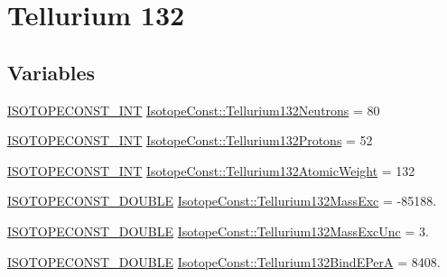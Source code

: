 \hypertarget{group___isotope_const-_tellurium-_te132}{}\section{Tellurium 132}
\label{group___isotope_const-_tellurium-_te132}
\subsection*{Variables}
\begin{DoxyCompactItemize}
\item 
\mbox{\hyperlink{group___isotope_const-_macros_ga5f18360b3e99483a35c32d789e62621c}{I\+S\+O\+T\+O\+P\+E\+C\+O\+N\+S\+T\+\_\+\+I\+NT}} \mbox{\hyperlink{group___isotope_const-_tellurium-_te132_ga6560f23356e4ba567d8e2cf1ead3287b}{Isotope\+Const\+::\+Tellurium132\+Neutrons}} = 80
\item 
\mbox{\hyperlink{group___isotope_const-_macros_ga5f18360b3e99483a35c32d789e62621c}{I\+S\+O\+T\+O\+P\+E\+C\+O\+N\+S\+T\+\_\+\+I\+NT}} \mbox{\hyperlink{group___isotope_const-_tellurium-_te132_gaf0aa5df2baffe38d65011ba79f5e76c4}{Isotope\+Const\+::\+Tellurium132\+Protons}} = 52
\item 
\mbox{\hyperlink{group___isotope_const-_macros_ga5f18360b3e99483a35c32d789e62621c}{I\+S\+O\+T\+O\+P\+E\+C\+O\+N\+S\+T\+\_\+\+I\+NT}} \mbox{\hyperlink{group___isotope_const-_tellurium-_te132_ga73a0da92aa12ca67033b6f66eb587bd5}{Isotope\+Const\+::\+Tellurium132\+Atomic\+Weight}} = 132
\item 
\mbox{\hyperlink{group___isotope_const-_macros_ga8f45a7272ce02c0b4c65c44636ed719a}{I\+S\+O\+T\+O\+P\+E\+C\+O\+N\+S\+T\+\_\+\+D\+O\+U\+B\+LE}} \mbox{\hyperlink{group___isotope_const-_tellurium-_te132_gaa900b5d175b684f3ae7f1a87355881c2}{Isotope\+Const\+::\+Tellurium132\+Mass\+Exc}} = -\/85188.
\item 
\mbox{\hyperlink{group___isotope_const-_macros_ga8f45a7272ce02c0b4c65c44636ed719a}{I\+S\+O\+T\+O\+P\+E\+C\+O\+N\+S\+T\+\_\+\+D\+O\+U\+B\+LE}} \mbox{\hyperlink{group___isotope_const-_tellurium-_te132_ga3e4c524ce6c656f63522352351b34e2a}{Isotope\+Const\+::\+Tellurium132\+Mass\+Exc\+Unc}} = 3.
\item 
\mbox{\hyperlink{group___isotope_const-_macros_ga8f45a7272ce02c0b4c65c44636ed719a}{I\+S\+O\+T\+O\+P\+E\+C\+O\+N\+S\+T\+\_\+\+D\+O\+U\+B\+LE}} \mbox{\hyperlink{group___isotope_const-_tellurium-_te132_ga8c631e1e1fa08cb03674899b35156b47}{Isotope\+Const\+::\+Tellurium132\+Bind\+E\+PerA}} = 8408.
\item 

\end{DoxyCompactItemize}
